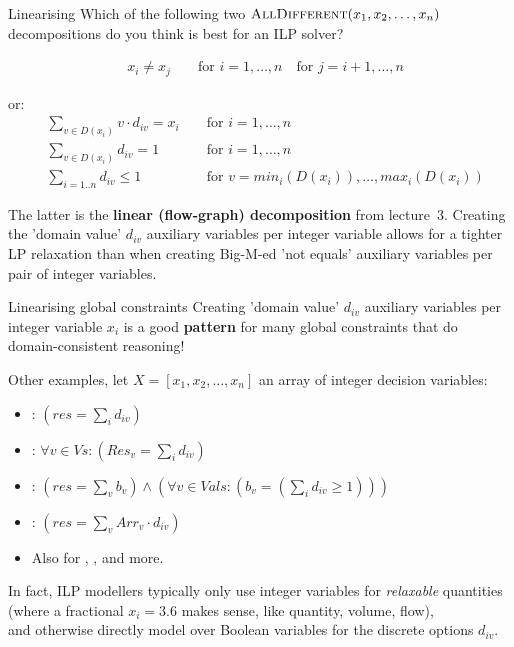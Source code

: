 \documentclass{cons-beamer}
\begin{document}
\begin{frame}{Linearising }
	Which of the following two $\textsc{AllDifferent}(x_1, x_2, \ldots, x_n)$ decompositions do you think is best for an ILP solver?
	\vfill
	
	{\small
	\begin{align*}
		&x_i \neq x_j &&\text{ for } i=1,\ldots,n \quad \text{for } j=i+1,\ldots,n
	\end{align*}
	}
	\vfill
	
	or:
	{\small
	\begin{align*}
		&\sum_{v \in D(x_i)} v\cdot d_{iv} = x_i &&\text{ for } i=1,\ldots,n \\
		&\sum_{v \in D(x_i)} d_{iv} = 1 &&\text{ for } i=1,\ldots,n \\
		&\sum_{i=1..n} d_{iv} \leq 1 &&\text{ for } v=min_i(D(x_i)),\ldots,max_i(D(x_i))
	\end{align*}
	}
	\vfill
	\pause
	
	The latter is the \textbf{linear (flow-graph) decomposition} from lecture~3. Creating the 'domain value' $d_{iv}$ auxiliary variables per integer variable allows for a tighter LP relaxation than when creating Big-M-ed 'not equals' auxiliary variables per pair of integer variables.
\end{frame}

\begin{frame}{Linearising global constraints}
	Creating 'domain value' $d_{iv}$ auxiliary variables per integer variable  $x_i$ is a good \textbf{pattern} for many global constraints that do domain-consistent reasoning!
	\vfill
	
	Other examples, let $X = [x_1, x_2, \ldots, x_n]$ an array of integer decision variables:
	\begin{itemize}
		\item {}: $(res = \sum_i d_{iv})$
		\item {}: $\forall v \in Vs: (Res_v = \sum_i d_{iv})$
		\item {}: $(res = \sum_v b_v) \land \left(\forall v \in Vals: (b_v = (\sum_i d_{iv} \geq 1))\right)$
		\item {}: $(res = \sum_v Arr_v\cdot d_{iv})$
		\item Also for , ,  and more.
	\end{itemize}
	\vfill
	\pause
	
	In fact, ILP modellers typically only use integer variables for \textit{relaxable} quantities (where a fractional $x_i = 3.6$ makes sense, like quantity, volume, flow),\\
	and otherwise directly model over Boolean variables for the discrete options $d_{iv}$.
\end{frame}
\end{document}
